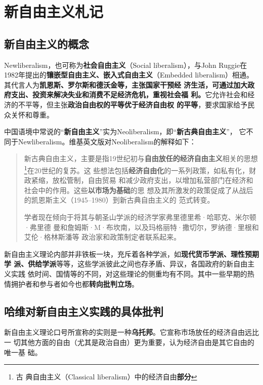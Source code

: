 \chapter{新自由主义札记}
\label{chap:neoliber}

\section{新自由主义的概念}

Newliberalism，也可称为\textbf{社会自由主义}（Social liberalism），与John
Ruggie在1982年提出的\textbf{镶嵌型自由主义、嵌入式自由主义}（Embedded
liberalism）相通。其代言人为\textbf{凯恩斯、罗尔斯和德沃金等，主张国家干预经
  济生活，可通过加大政府支出、投资来解决失业和消费不足经济危机，重视社会福
  利。}它允许社会和经济的不平等，但主张\textbf{政治自由权的平等优于经济自由权
  的平等}，要求国家给予民众关怀和尊重。\cite{newneo}

中国语境中常说的“\textbf{新自由主义}”实为Neoliberalism，即“\textbf{新古典自由主义}”，
它不同于Newliberalism。维基英文版对Neoliberalism的解释如下：
\begin{quotation}
  新古典自由主义，主要是指19世纪初与\textbf{自由放任的经济自由主义}相关的思想\footnote{古
    典自由主义（Classical liberalism）中的经济自由\textbf{部分}}在20世纪的复苏。这
  些想法包括\textbf{经济自由化}的一系列政策，如私有化，财政紧缩，放松管制，自由贸易
  和减少政府支出，以增加私营部门在经济和社会中的作用。这些\textbf{以市场为基础}的思
  想及其所激发的政策促成了从战后的凯恩斯主义（1945--1980）到新古典自由主义的
  范式转变。

  学者现在倾向于将其与朝圣山学派的经济学家弗里德里希·哈耶克、米尔顿·弗里德
  曼和詹姆斯·M·布坎南，以及玛格丽特·撒切尔，罗纳德·里根和艾伦·格林斯潘等
  政治家和政策制定者联系起来。
\end{quotation}

新自由主义理论内部并非铁板一块，充斥着各种学派，如\textbf{现代货币学派、理性预期学
  派、供给学派}等等，这些学派彼此之间也存矛盾、异议，各国政府的新自由主义实践
依时间、国情等的不同，对这些理论的侧重均有不同。\cite{neoxuepai}其中一些早期的热
情拥护者和参与者如今也都\textbf{转向批判立场}。



\section{哈维对新自由主义实践的具体批判}

新自由主义理论口号所宣称的实则是一种\textbf{乌托邦}。它宣称市场放任的经济自由远比一
切其他方面的自由（尤其是政治自由）更为重要，认为经济自由是其它自由的唯一基
础。

